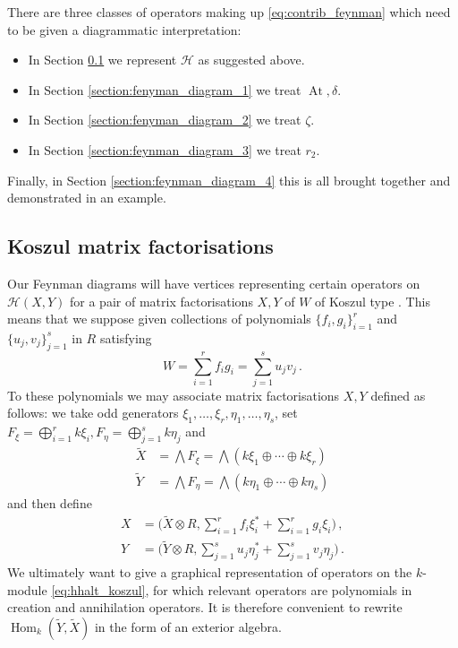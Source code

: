 \documentclass[english,letter paper,12pt,leqno]{article}
\theoremstyle{example}
\numberwithin{equation}{section}
\def\HH{\HH}
\def\HH{\mathcal{H}}
\def\Hom{\operatorname{Hom}}
\DeclareMathOperator{\vAt}{At}
\begin{document}
There are three classes of operators making up \eqref{eq:contrib_feynman} which need to be given a diagrammatic interpretation:
\begin{itemize}
\item In Section \ref{section:koszul_mf} we represent $\HH$ as suggested above.
\item In Section \ref{section:fenyman_diagram_1} we treat $\vAt, \delta$.
\item In Section \ref{section:fenyman_diagram_2} we treat $\zeta$.
\item In Section \ref{section:feynman_diagram_3} we treat $r_2$.
\end{itemize}
Finally, in Section \ref{section:feynman_diagram_4} this is all brought together and demonstrated in an example.

\subsection{Koszul matrix factorisations}\label{section:koszul_mf}

Our Feynman diagrams will have vertices representing certain operators on $\HH(X,Y)$ for a pair of matrix factorisations $X,Y$ of $W$ of Koszul type \cite{??}. This means that we suppose given collections of polynomials $\{ f_i, g_i \}_{i=1}^r$ and $\{ u_j, v_j \}_{j=1}^s$ in $R$ satisfying
\[
W = \sum_{i=1}^r f_i g_i = \sum_{j=1}^s u_j v_j\,.
\]
To these polynomials we may associate matrix factorisations $X,Y$ defined as follows: we take odd generators $\xi_1,\ldots,\xi_r,\eta_1,\ldots,\eta_s$, set $F_\xi = \bigoplus_{i=1}^r k \xi_i, F_\eta = \bigoplus_{j=1}^s k \eta_j$ and
\begin{align}
\widetilde{X} &= \bigwedge F_\xi = \bigwedge( k \xi_1 \oplus \cdots \oplus k \xi_r )\label{eq:defn_X_tilde}\\
\widetilde{Y} &= \bigwedge F_\eta = \bigwedge( k \eta_1 \oplus \cdots \oplus k \eta_s )\label{eq:defn_Y_tilde}
\end{align}
and then define
\begin{align*}
X &= \big( \widetilde{X} \otimes R, \sum_{i=1}^r f_i \xi_i^* + \sum_{i=1}^r g_i \xi_i \big)\,,\\
Y &= \big( \widetilde{Y} \otimes R, \sum_{j=1}^s u_j \eta_j^* + \sum_{j=1}^s v_j \eta_j \big)\,.
\end{align*}
We ultimately want to give a graphical representation of operators on the $k$-module \eqref{eq:hhalt_koszul}, for which relevant operators are polynomials in creation and annihilation operators. It is therefore convenient to rewrite $\Hom_k( \widetilde{Y}, \widetilde{X} )$ in the form of an exterior algebra.
\end{document}
